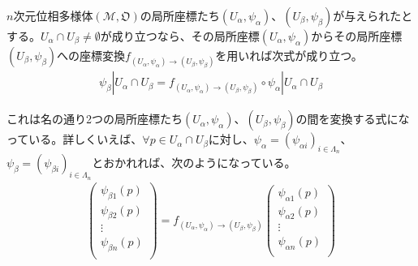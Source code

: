 \documentclass[dvipdfmx]{jsarticle}
\begin{document}
\begin{thm}\label{8.3.1.7}
$n$次元位相多様体$\left( \mathcal{M},\mathfrak{O} \right)$の局所座標たち$\left( U_{\alpha},\psi_{\alpha} \right)$、$\left( U_{\beta},\psi_{\beta} \right)$が与えられたとする。$U_{\alpha} \cap U_{\beta} \neq \emptyset$が成り立つなら、その局所座標$\left( U_{\alpha},\psi_{\alpha} \right)$からその局所座標$\left( U_{\beta},\psi_{\beta} \right)$への座標変換$f_{\left( U_{\alpha},\psi_{\alpha} \right) \rightarrow \left( U_{\beta},\psi_{\beta} \right)}$を用いれば次式が成り立つ。
\begin{align*}
\psi_{\beta}|U_{\alpha} \cap U_{\beta} = f_{\left( U_{\alpha},\psi_{\alpha} \right) \rightarrow \left( U_{\beta},\psi_{\beta} \right)} \circ \psi_{\alpha}|U_{\alpha} \cap U_{\beta}
\end{align*}
\end{thm}\par
これは名の通り2つの局所座標たち$\left( U_{\alpha},\psi_{\alpha} \right)$、$\left( U_{\beta},\psi_{\beta} \right)$の間を変換する式になっている。詳しくいえば、$\forall p \in U_{\alpha} \cap U_{\beta}$に対し、$\psi_{\alpha} = \left( \psi_{\alpha i} \right)_{i \in \varLambda_{n}}$、$\psi_{\beta} = \left( \psi_{\beta i} \right)_{i \in \varLambda_{n}}$とおかれれば、次のようになっている。
\begin{align*}
\begin{pmatrix}
\psi_{\beta 1}(p) \\
\psi_{\beta 2}(p) \\
 \vdots \\
\psi_{\beta n}(p) \\
\end{pmatrix} = f_{\left( U_{\alpha},\psi_{\alpha} \right) \rightarrow \left( U_{\beta},\psi_{\beta} \right)}\begin{pmatrix}
\psi_{\alpha 1}(p) \\
\psi_{\alpha 2}(p) \\
 \vdots \\
\psi_{\alpha n}(p) \\
\end{pmatrix}
\end{align*}
\end{document}
